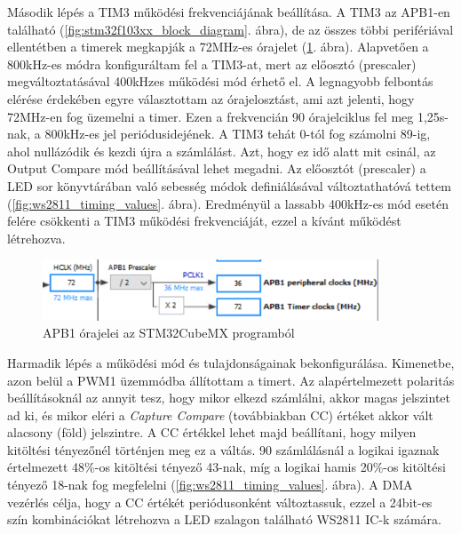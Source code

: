 \documentclass[../main.tex]{subfiles}
\begin{document}
            
            Második lépés a TIM3 működési frekvenciájának beállítása. A TIM3 az APB1-en található (\ref{fig:stm32f103xx_block_diagram}. ábra), de az összes többi perifériával ellentétben a timerek megkapják a 72MHz-es órajelet (\ref{fig:tim3_clk_src}. ábra). Alapvetően a 800kHz-es módra konfiguráltam fel a TIM3-at, mert az előosztó (prescaler) megváltoztatásával 400kHzes működési mód érhető el.
            A legnagyobb felbontás elérése érdekében egyre választottam az órajelosztást, ami azt jelenti, hogy 72MHz-en fog üzemelni a timer. Ezen a frekvencián 90 órajelciklus fel meg 1,25\micro s-nak, a 800kHz-es jel periódusidejének. A TIM3 tehát 0-tól fog számolni 89-ig, ahol nullázódik és kezdi újra a számlálást. Azt, hogy ez idő alatt mit csinál, az Output Compare mód beállításával lehet megadni.
            Az előosztót (prescaler) a LED sor könyvtárában való sebesség módok definiálásával változtathatóvá tettem (\ref{fig:ws2811_timing_values}. ábra). Eredményül a lassabb 400kHz-es mód esetén felére csökkenti a TIM3 működési frekvenciáját, ezzel a kívánt működést létrehozva.
            
            \begin{figure}[h!]
                \centering
                    \includegraphics[width=10cm]{mbed_res/tim3_clock_src}
                \caption{APB1 órajelei az STM32CubeMX programból}
                \label{fig:tim3_clk_src}
            \end{figure}
            
            Harmadik lépés a működési mód és tulajdonságainak bekonfigurálása. Kimenetbe, azon belül a PWM1 üzemmódba állítottam a timert. Az alapértelmezett polaritás beállításoknál az annyit tesz, hogy mikor elkezd számlálni, akkor magas jelszintet ad ki, és mikor eléri a \textit{Capture Compare} (továbbiakban CC) értéket akkor vált alacsony (föld) jelszintre. A CC értékkel lehet majd beállítani, hogy milyen kitöltési tényezőnél történjen meg ez a váltás. 90 számlálásnál a logikai igaznak értelmezett 48\%-os kitöltési tényező 43-nak, míg a logikai hamis 20\%-os kitöltési tényező 18-nak fog megfelelni (\ref{fig:ws2811_timing_values}. ábra). A DMA vezérlés célja, hogy a CC értékét periódusonként változtassuk, ezzel a 24bit-es szín kombinációkat létrehozva a LED szalagon található WS2811 IC-k számára.
            
\end{document}
